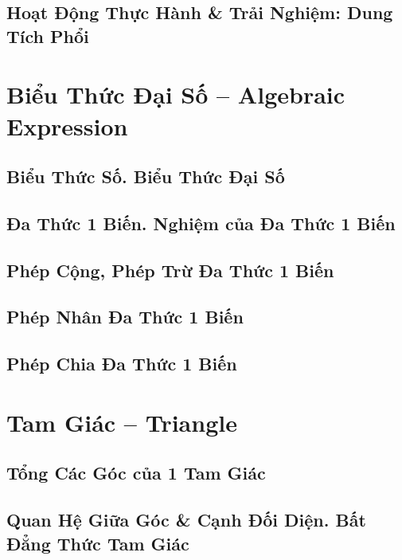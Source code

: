 \documentclass{article}
\numberwithin{equation}{section}
\begin{document}
\subsection{Hoạt Động Thực Hành \& Trải Nghiệm: Dung Tích Phổi}


\section{Biểu Thức Đại Số -- Algebraic Expression}

\subsection{Biểu Thức Số. Biểu Thức Đại Số}

\subsection{Đa Thức 1 Biến. Nghiệm của Đa Thức 1 Biến}

\subsection{Phép Cộng, Phép Trừ Đa Thức 1 Biến}

\subsection{Phép Nhân Đa Thức 1 Biến}

\subsection{Phép Chia Đa Thức 1 Biến}


\section{Tam Giác -- Triangle}

\subsection{Tổng Các Góc của 1 Tam Giác}

\subsection{Quan Hệ Giữa Góc \& Cạnh Đối Diện. Bất Đẳng Thức Tam Giác}
\end{document}
